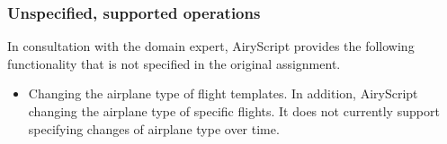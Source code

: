 \subsubsection{Unspecified, supported operations}
\label{sec:unspecified_supported}
In consultation with the domain expert, AiryScript provides the following
functionality that is not specified in the original assignment.
\begin{itemize}
  \item Changing the airplane type of flight templates. In addition, AiryScript
    changing the airplane type of specific flights.
    It does not currently support specifying changes of airplane type over time.    %

\end{itemize}


